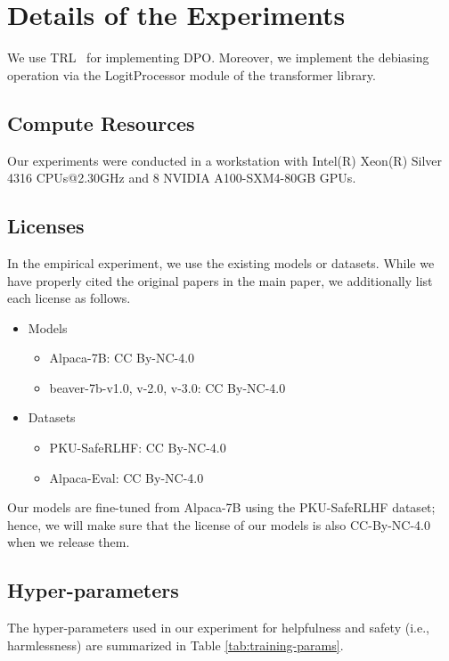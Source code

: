 \newpage
\section{Details of the Experiments\label{appendix:implementation-detail}}
We use TRL~\citep{vonwerra2022trl} for implementing DPO. Moreover, we implement the debiasing operation via the LogitProcessor module of the transformer library.

\subsection{Compute Resources}
\label{subsec:compute_resources}

Our experiments were conducted in a workstation with Intel(R) Xeon(R) Silver 4316 CPUs@2.30GHz and 8 NVIDIA A100-SXM4-80GB GPUs.

\subsection{Licenses}
\label{subsec:license}

In the empirical experiment, we use the existing models or datasets.
While we have properly cited the original papers in the main paper, we additionally list each license as follows. 

\begin{itemize}
    \item Models
    \begin{itemize}
        \item Alpaca-7B: CC By-NC-4.0
        \item beaver-7b-v1.0, v-2.0, v-3.0: CC By-NC-4.0
    \end{itemize}
    \item Datasets
    \begin{itemize}
        \item PKU-SafeRLHF: CC By-NC-4.0
        \item Alpaca-Eval: CC By-NC-4.0
    \end{itemize}
\end{itemize}

Our models are fine-tuned from Alpaca-7B using the PKU-SafeRLHF dataset; hence, we will make sure that the license of our models is also CC-By-NC-4.0 when we release them.

\subsection{Hyper-parameters\label{appendix:training-hyperparameter}}
The hyper-parameters used in our experiment for helpfulness and safety (i.e., harmlessness) are summarized in Table \ref{tab:training-params}.

